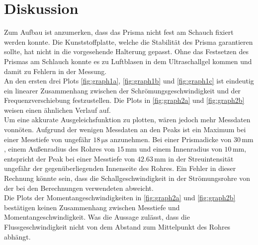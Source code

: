 \section{Diskussion}
\label{sec:diskussion}

Zum Aufbau ist anzumerken, dass das Prisma nicht fest am Schauch fixiert werden konnte. Die Kunststoffplatte, welche die Stabilität des Prisma garantieren sollte, hat nicht in die vorgesehende Halterung gepasst.
Ohne das Festsetzen des Prismas am Schlauch konnte es zu Luftblasen in dem Ultraschallgel kommen und damit zu Fehlern in der Messung. \\

An den ersten drei Plots \autoref{fig:graph1a}, \autoref{fig:graph1b} und \autoref{fig:graph1c} ist eindeutig ein linearer Zusammenhang zwischen der Schrömungsgeschwindigkeit und der Frequenzverschiebung festzustellen.
Die Plots in \autoref{fig:graph2a} und \autoref{fig:graph2b} weisen einen ähnlichen Verlauf auf. \\
Um eine akkurate Ausgeleichsfunktion zu plotten, wären jedoch mehr Messdaten vonnöten. 
Aufgrund der wenigen Messdaten an den Peaks ist ein Maximum bei einer Messtiefe von ungefähr $18  \, \unit{\micro\second}$ anzunehmen. 
Bei einer Prismadicke von $30 \, \unit{\milli\meter} $, einem Außenradius des Rohres von $15 \, \unit{\milli\meter} $ und einem Innenradius von $10 \, \unit{\milli\meter}  $, entspricht der Peak bei einer Messtiefe von  $42.63 \, \unit{\milli\meter} $ in der Streuintensität ungefähr der gegenüberliegenden Innenseite des Rohres.
Ein Fehler in dieser Rechnung könnte sein, dass die Schallgeschwindigkeit in der Strömungsrohre von der bei den Berechnungen verwendeten abweicht.\\


Die Plots der Momentangeschwindigkeiten in \autoref{fig:graph2a} und \autoref{fig:graph2b} bestätigen keinen Zusammenhang zwischen Messtiefe und Momentangeschwindigkeit.
Was die Aussage zulässt, dass die Flussgeschwindigkeit nicht von dem Abstand zum Mittelpunkt des Rohres abhängt.